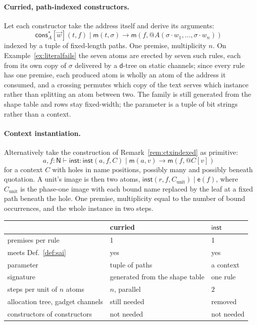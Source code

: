 \documentclass[11pt]{article}
\makeatletter
\theoremstyle{plain}
\theoremstyle{definition}
\theoremstyle{remark}
\newcommand{\quo}[1]{@#1}
\newcommand{\mm}{\mathsf{m}}
\newcommand{\dd}{\mathsf{d}}
\newcommand{\ev}{\mathsf{e}}
\newcommand{\cons}{\mathsf{cons}}
\newcommand{\inst}{\mathsf{inst}}
\newcommand{\red}{\longrightarrow}
\makeatother
\begin{document}
\paragraph{Curried, path-indexed constructors.} Let each constructor take the
address itself and derive its arguments:
\[
  \cons^{*}_{A}[\vec w](t,f) \mid \mm(t,\sigma) \red
  \mm(f, \quo{A(\sigma\!\cdot\!w_{1},\dots,\sigma\!\cdot\!w_{n})})
\]
indexed by a tuple of fixed-length paths. One premise, multiplicity $n$. On
Example~\ref{ex:literalfails} the seven atoms are erected by seven such
rules, each from its own copy of $\sigma$ delivered by a $\dd$-tree on static
channels; since every rule has one premise, each produced atom is wholly an
atom of the address it consumed, and a crossing permutes which copy of the
text serves which instance rather than splitting an atom between two. The
family is still generated from the shape table and rows stay fixed-width; the
parameter is a tuple of bit strings rather than a context.

\paragraph{Context instantiation.} Alternatively take the construction of
Remark~\ref{rem:ctxindexed} as primitive:
\[
  a,f : \mathsf{N} \vdash \mathsf{inst} :
  \inst(a,f,C) \mid \mm(a,v) \red \mm(f,\quo{C[v]})
\]
for a context $C$ with holes in name positions, possibly many and possibly
beneath quotation. A unit's image is then two atoms,
$\inst(r,f,C_{\mathrm{unit}}) \mid \ev(f)$, where $C_{\mathrm{unit}}$ is the
phase-one image with each bound name replaced by the leaf at a fixed path
beneath the hole. One premise, multiplicity equal to the number of bound
occurrences, and the whole instance in two steps.

\begin{center}
\begin{tabular}{@{}lll@{}}
\toprule
 & curried & $\inst$\\
\midrule
premises per rule & 1 & 1\\
meets Def.~\ref{def:sai} & yes & yes\\
parameter & tuple of paths & a context\\
signature & generated from the shape table & one rule\\
steps per unit of $n$ atoms & $n$, parallel & $2$\\
allocation tree, gadget channels & still needed & removed\\
constructors of constructors & not needed & not needed\\
\bottomrule
\end{tabular}
\end{center}
\end{document}
